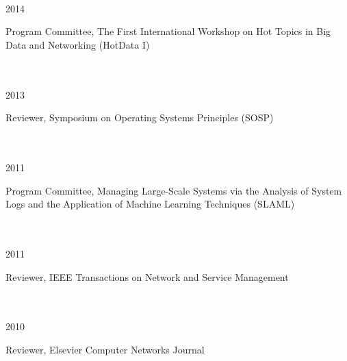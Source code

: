 \documentclass[11pt]{article}
\newcommand{\parwidth}{5.3 in}
\newcommand{\pagewidth}{6.8 in}
\newcommand{\tabwidth}{1.5 in}
\begin{document}
\begin{tabbing}
\hspace{\tabwidth} \= \\
2014 \> \parbox[t]{\parwidth}{Program Committee, The First International Workshop on Hot Topics in Big Data and Networking (HotData I)}\\ \\
2013 \> \parbox[t]{\parwidth}{Reviewer, Symposium on Operating Systems Principles (SOSP)}\\ \\
2011 \> \parbox[t]{\parwidth}{Program Committee, Managing Large-Scale Systems via the Analysis of System Logs and the Application of Machine Learning Techniques (SLAML)}\\ \\
2011 \> \parbox[t]{\parwidth}{Reviewer, IEEE Transactions on Network and Service Management}\\ \\
2010 \> \parbox[t]{\parwidth}{Reviewer, Elsevier Computer Networks Journal}

\end{tabbing}
\end{document}
